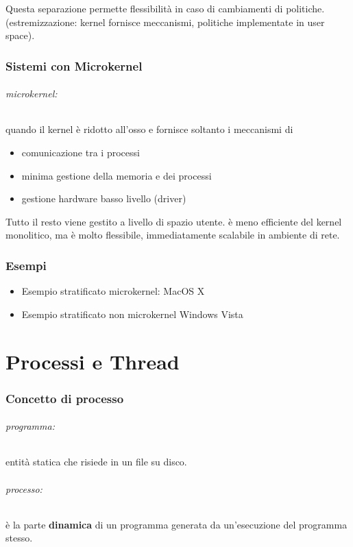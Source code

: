 \documentclass{article}
\begin{document}
Questa separazione permette flessibilità in caso di cambiamenti di politiche. (estremizzazione: kernel fornisce meccanismi, politiche implementate in user space).


\section{Sistemi con Microkernel}
\paragraph{microkernel:} quando il kernel è ridotto all'osso e fornisce soltanto i meccanismi di 
\begin{itemize}
    \item comunicazione tra i processi
    \item minima gestione della memoria e dei processi
    \item gestione hardware basso livello (driver)
\end{itemize}
Tutto il resto viene gestito a livello di spazio utente. è meno efficiente del kernel monolitico, ma è molto flessibile, 
immediatamente scalabile in ambiente di rete.

\section{Esempi}
\begin{itemize}
    \item Esempio stratificato microkernel: MacOS X
    \item Esempio stratificato non microkernel Windows Vista
\end{itemize}

\part{Processi e Thread} %
\section{Concetto di processo}
\paragraph{programma:} entità statica che risiede in un file su disco.
\paragraph{processo:} è la parte \textbf{dinamica} di un programma generata da un'esecuzione del programma stesso.
\end{document}
